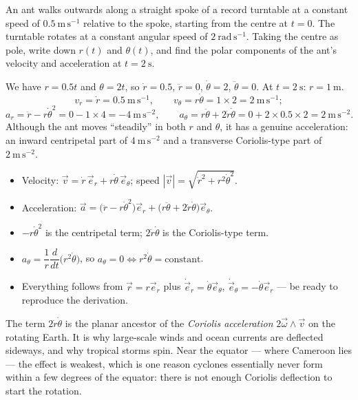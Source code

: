 \documentclass[11pt]{article}
\begin{document}
\begin{exercice}
An ant walks outwards along a straight spoke of a record turntable at a constant speed of $0.5\ \mathrm{m\,s^{-1}}$ relative to the spoke, starting from the centre at $t=0$. The turntable rotates at a constant angular speed of $2\ \mathrm{rad\,s^{-1}}$. Taking the centre as pole, write down $r(t)$ and $\theta(t)$, and find the polar components of the ant's velocity and acceleration at $t=2\ \mathrm{s}$.
\end{exercice}

\begin{corrige}[Exercise 2]
We have $r=0.5t$ and $\theta=2t$, so $\dot r=0.5$, $\ddot r=0$, $\dot\theta=2$, $\ddot\theta=0$. At $t=2\ \mathrm{s}$: $r=1\ \mathrm{m}$.
\[
v_r=\dot r=0.5\ \mathrm{m\,s^{-1}},\qquad v_\theta=r\dot\theta=1\times2=2\ \mathrm{m\,s^{-1}};
\]
\[
a_r=\ddot r-r\dot\theta^{2}=0-1\times4=-4\ \mathrm{m\,s^{-2}},\qquad
a_\theta=r\ddot\theta+2\dot r\dot\theta=0+2\times0.5\times2=2\ \mathrm{m\,s^{-2}} .
\]
Although the ant moves ``steadily'' in both $r$ and $\theta$, it has a genuine acceleration: an inward centripetal part of $4\ \mathrm{m\,s^{-2}}$ and a transverse Coriolis-type part of $2\ \mathrm{m\,s^{-2}}$.
\end{corrige}

\begin{aretenir}
\begin{itemize}
\item Velocity: $\vec v=\dot r\,\vec e_r+r\dot\theta\,\vec e_\theta$; speed $|\vec v|=\sqrt{\dot r^{2}+r^{2}\dot\theta^{2}}$.
\item Acceleration: $\vec a=\bigl(\ddot r-r\dot\theta^{2}\bigr)\vec e_r+\bigl(r\ddot\theta+2\dot r\dot\theta\bigr)\vec e_\theta$.
\item $-r\dot\theta^2$ is the centripetal term; $2\dot r\dot\theta$ is the Coriolis-type term.
\item $a_\theta=\dfrac{1}{r}\dfrac{d}{dt}\bigl(r^{2}\dot\theta\bigr)$, so $a_\theta=0\iff r^{2}\dot\theta=\text{constant}$.
\item Everything follows from $\vec r=r\vec e_r$ plus $\dot{\vec e}_r=\dot\theta\vec e_\theta$, $\dot{\vec e}_\theta=-\dot\theta\vec e_r$ — be ready to reproduce the derivation.
\end{itemize}
\end{aretenir}

\begin{savaistu}
The term $2\dot r\dot\theta$ is the planar ancestor of the \emph{Coriolis acceleration} $2\vec\omega\wedge\vec v$ on the rotating Earth. It is why large-scale winds and ocean currents are deflected sideways, and why tropical storms spin. Near the equator — where Cameroon lies — the effect is weakest, which is one reason cyclones essentially never form within a few degrees of the equator: there is not enough Coriolis deflection to start the rotation.
\end{savaistu}
\end{document}
